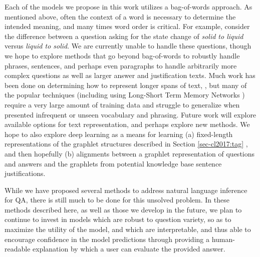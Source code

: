 Each of the models we propose in this work utilizes a bag-of-words approach.
As mentioned above, often the context of a word is necessary to determine the intended meaning, and many times word order is critical.  For example, consider the difference between a question asking for the state change of \textit{solid to liquid} versus \textit{liquid to solid}.  We are currently unable to handle these questions, though we hope to explore methods that go beyond bag-of-words to robustly handle phrases, sentences, and perhaps even paragraphs to handle arbitrarily more complex questions as well as larger answer and justification texts. 
Much work has been done on determining how to represent longer spans of text, \citep[inter alia,][]{Le2014DistributedRO, Sutskever2014SequenceTS, Pagliardini2017UnsupervisedLO}, but many of the popular techniques (including using Long-Short Term Memory Networks \citep[LSTMs;][]{hochreiter1997long}) require a very large amount of training data and struggle to generalize when presented infrequent or unseen vocabulary and phrasing.  Future work will explore available options for text representation, and perhaps explore new methods.  We hope to also explore deep learning as a means for learning (a) fixed-length representations of the graphlet structures described in Section \ref{sec-cl2017:tag} \citep{jansen2017framing}, and then hopefully (b) alignments between a graphlet representation of questions and answers and the graphlets from potential knowledge base sentence justifications.


While we have proposed several methods to address natural language inference for QA, there is still much to be done for this unsolved problem.  In these methods described here, as well as those we develop in the future, we plan to continue to invest in models which are robust to question variety, so as to maximize the utility of the model, and which are interpretable, and thus able to encourage confidence in the model predictions through providing a human-readable explanation by which a user can evaluate the provided answer.





